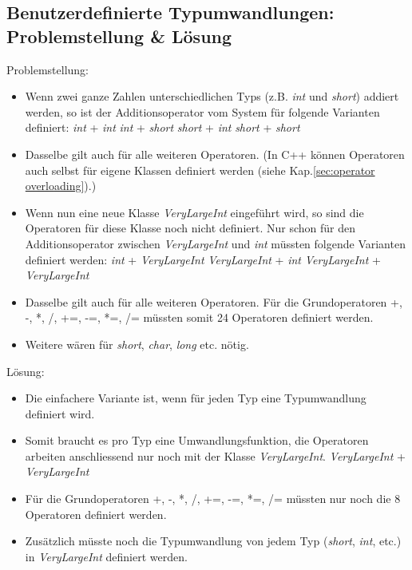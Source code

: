 \subsection{Benutzerdefinierte Typumwandlungen: Problemstellung \& Lösung}
Problemstellung:
\begin{itemize}
	\item Wenn zwei ganze Zahlen unterschiedlichen Typs (z.B. \emph{int} und \emph{short}) addiert werden, so ist der Additionsoperator vom System für folgende Varianten definiert:
	\subitem \emph{int} + \emph{int}
	\subitem \emph{int} + \emph{short}
	\subitem \emph{short} + \emph{int}
	\subitem \emph{short} + \emph{short}
	\item Dasselbe gilt auch für alle weiteren Operatoren. (In C++ können Operatoren auch selbst für eigene Klassen definiert werden (siehe Kap.\ref{sec:operator overloading}).)
	\item Wenn nun eine neue Klasse \emph{VeryLargeInt} eingeführt wird, so sind die Operatoren für diese Klasse noch nicht definiert. Nur schon für den Additionsoperator zwischen \emph{VeryLargeInt} und \emph{int} müssten folgende Varianten definiert werden:
	\subitem \emph{int} + \emph{VeryLargeInt}
	\subitem \emph{VeryLargeInt} + \emph{int}
	\subitem \emph{VeryLargeInt} + \emph{VeryLargeInt}
	\item Dasselbe gilt auch für alle weiteren Operatoren. Für die Grundoperatoren +, -, *, /, +=, -=, *=, /= müssten somit 24 Operatoren definiert werden.
	\item Weitere wären für \emph{short}, \emph{char}, \emph{long} etc. nötig.
\end{itemize}
Lösung:
\begin{itemize}
	\item Die einfachere Variante ist, wenn für jeden Typ eine Typumwandlung definiert wird.
	\item Somit braucht es pro Typ eine Umwandlungsfunktion, die Operatoren arbeiten anschliessend nur noch mit der Klasse \emph{VeryLargeInt}.
	\subitem \emph{VeryLargeInt} + \emph{VeryLargeInt}
	\item Für die Grundoperatoren +, -, *, /, +=, -=, *=, /= müssten nur noch die 8 Operatoren definiert werden.
	\item Zusätzlich müsste noch die Typumwandlung von jedem Typ (\emph{short}, \emph{int}, etc.) in \emph{VeryLargeInt} definiert werden. 
\end{itemize}
\clearpage\pagebreak


